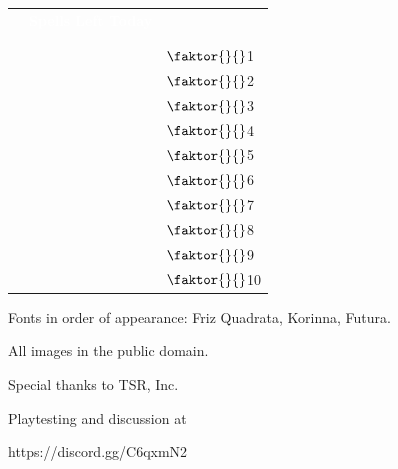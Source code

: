 \documentclass[twoside]{article}
\begin{document}
\begin{tabular}[t]{|>{\centering\arraybackslash}p{}|>{\centering\arraybackslash}p{}|>{\centering\arraybackslash}p{}|}
\rowcolor[gray]{0}\multicolumn{2}{c|}{\textcolor{white}{\textbf{Spells}}}&\textcolor{white}{\textbf{Spells Left Today}}\\
&&\\\cline{1-2}
&&\multirow{-2}{=}{\hfill$\faktor{}{}$\hfill\phantom{l}---}\\\hline
&&\hfill$\faktor{}{}$\hfill\phantom{0}1\\\hline
&&\hfill$\faktor{}{}$\hfill\phantom{0}2\\\hline
&&\hfill$\faktor{}{}$\hfill\phantom{0}3\\\hline
&&\hfill$\faktor{}{}$\hfill\phantom{0}4\\\hline
&&\hfill$\faktor{}{}$\hfill\phantom{0}5\\\hline
&&\hfill$\faktor{}{}$\hfill\phantom{0}6\\\hline
&&\hfill$\faktor{}{}$\hfill\phantom{0}7\\\hline
&&\hfill$\faktor{}{}$\hfill\phantom{0}8\\\hline
&&\hfill$\faktor{}{}$\hfill\phantom{0}9\\\hline
&&\hfill$\faktor{}{}$\hfill10\\\hline
\end{tabular}


\pagebreak

\thispagestyle{empty}
\mbox{}
\vfill
\centering\small

Fonts in order of appearance: Friz Quadrata, Korinna, Futura.\vspace{-5pt}

All images in the public domain.\vspace{-5pt}

Special thanks to TSR, Inc.\vspace{-5pt}

Playtesting and discussion at\vspace{-5pt}

https://discord.gg/C6qxmN2
\end{document}
